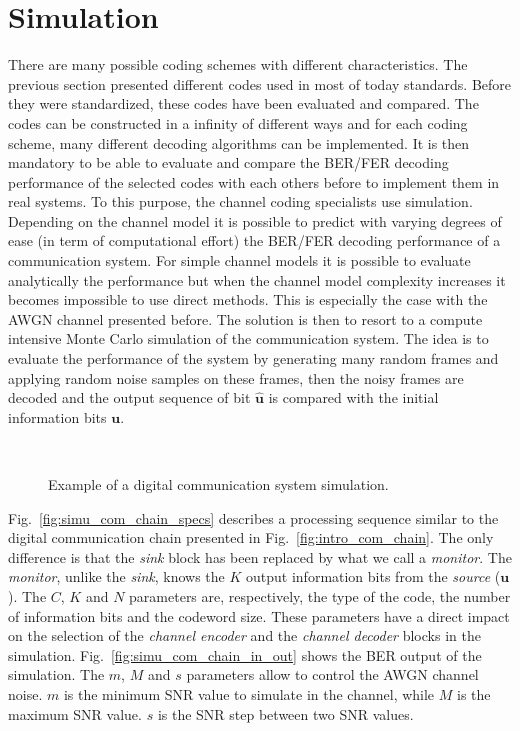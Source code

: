 \section{Simulation}

There are many possible coding schemes with different characteristics. The
previous section presented different codes used in most of today standards.
Before they were standardized, these codes have been evaluated and compared.
The codes can be constructed in a infinity of different ways and for each coding
scheme, many different decoding algorithms can be implemented. It is then
mandatory to be able to evaluate and compare the BER/FER decoding performance of
the selected codes with each others before to implement them in real systems. To
this purpose, the channel coding specialists use simulation. Depending on the
channel model it is possible to predict with varying degrees of ease (in term of
computational effort) the BER/FER decoding performance of a communication
system. For simple channel models it is possible to evaluate analytically the
performance but when the channel model complexity increases it becomes
impossible to use direct methods. This is especially the case with the AWGN
channel presented before. The solution is then to resort to a compute intensive
Monte Carlo simulation of the communication system. The idea is to evaluate the
performance of the system by generating many random frames and applying random
noise samples on these frames, then the noisy frames are decoded and the output
sequence of bit $\bm{\hat{u}}$ is compared with the initial information bits
$\bm{u}$.

\begin{figure}[htp]
  \centering
  \\
  \caption{Example of a digital communication system simulation.}
  \label{fig:simu_com_chain}
\end{figure}

Fig.~\ref{fig:simu_com_chain_specs} describes a processing sequence similar
to the digital communication chain presented in Fig.~\ref{fig:intro_com_chain}.
The only difference is that the \emph{sink} block has been replaced by what we
call a \emph{monitor}. The \emph{monitor}, unlike the \emph{sink}, knows the $K$
output information bits from the \emph{source} ($\bm{u}$). The $C$, $K$ and $N$
parameters are, respectively, the type of the code, the number of information
bits and the codeword size. These parameters have a direct impact on the
selection of the \emph{channel encoder} and the \emph{channel decoder} blocks
in the simulation. Fig.~\ref{fig:simu_com_chain_in_out} shows the BER output of
the simulation. The $m$, $M$ and $s$ parameters allow to control the AWGN
channel noise. $m$ is the minimum SNR value to simulate in the channel, while
$M$ is the maximum SNR value. $s$ is the SNR step between two SNR values.

